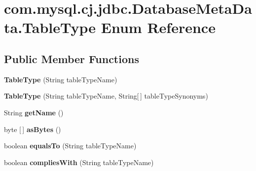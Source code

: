 \hypertarget{enumcom_1_1mysql_1_1cj_1_1jdbc_1_1_database_meta_data_1_1_table_type}{}\section{com.\+mysql.\+cj.\+jdbc.\+Database\+Meta\+Data.\+Table\+Type Enum Reference}
\label{enumcom_1_1mysql_1_1cj_1_1jdbc_1_1_database_meta_data_1_1_table_type}
\subsection*{Public Member Functions}
\begin{DoxyCompactItemize}
\item 
\mbox{\label{enumcom_1_1mysql_1_1cj_1_1jdbc_1_1_database_meta_data_1_1_table_type_aa8322d99d6c5dfebf2d447a31ef547ff}} 
{\bfseries Table\+Type} (String table\+Type\+Name)
\item 
\mbox{\label{enumcom_1_1mysql_1_1cj_1_1jdbc_1_1_database_meta_data_1_1_table_type_aacfc9c6cda58975d253c3ddf9fa4af88}} 
{\bfseries Table\+Type} (String table\+Type\+Name, String\mbox{[}$\,$\mbox{]} table\+Type\+Synonyms)
\item 
\mbox{\label{enumcom_1_1mysql_1_1cj_1_1jdbc_1_1_database_meta_data_1_1_table_type_aa587977cc6bd567eb090ae5d56896d8d}} 
String {\bfseries get\+Name} ()
\item 
\mbox{\label{enumcom_1_1mysql_1_1cj_1_1jdbc_1_1_database_meta_data_1_1_table_type_a774da2fff100b7f47ebc4f0a3f29d438}} 
byte \mbox{[}$\,$\mbox{]} {\bfseries as\+Bytes} ()
\item 
\mbox{\label{enumcom_1_1mysql_1_1cj_1_1jdbc_1_1_database_meta_data_1_1_table_type_a84a6c6e9c3ef798eab51af6c951d883e}} 
boolean {\bfseries equals\+To} (String table\+Type\+Name)
\item 
\mbox{\label{enumcom_1_1mysql_1_1cj_1_1jdbc_1_1_database_meta_data_1_1_table_type_a8c7797c022a5fd854ea2e72299021af8}} 
boolean {\bfseries complies\+With} (String table\+Type\+Name)
\end{DoxyCompactItemize}
